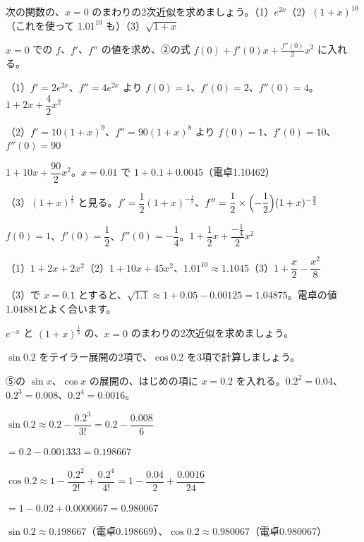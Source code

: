 \begin{reidai}[2次近似を作る]
次の関数の、$x=0$ のまわりの2次近似を求めましょう。\quad（1）$e^{2x}$\quad（2）$(1+x)^{10}$（これを使って $1.01^{10}$ も）\quad（3）$\sqrt{1+x}$\par
\kangaekata $x=0$ での $f$、$f'$、$f''$ の値を求め、②の式 $f(0)+f'(0)x+\frac{f''(0)}{2}x^2$ に入れる。\par
\shiki（1）$f'=2e^{2x}$、$f''=4e^{2x}$ より $f(0)=1$、$f'(0)=2$、$f''(0)=4$。$1+2x+\dfrac{4}{2}x^2$\par
\hspace*{2.6\zw}（2）$f'=10(1+x)^9$、$f''=90(1+x)^8$ より $f(0)=1$、$f'(0)=10$、$f''(0)=90$\par
\hspace*{4.6\zw}$1+10x+\dfrac{90}{2}x^2$。$x=0.01$ で $1+0.1+0.0045$（電卓1.10462）\par
\hspace*{2.6\zw}（3）$(1+x)^{\frac{1}{2}}$ と見る。$f'=\dfrac{1}{2}(1+x)^{-\frac{1}{2}}$、$f''=\dfrac{1}{2}\times\Bigl(-\dfrac{1}{2}\Bigr)(1+x)^{-\frac{3}{2}}$\par
\hspace*{4.6\zw}$f(0)=1$、$f'(0)=\dfrac{1}{2}$、$f''(0)=-\dfrac{1}{4}$。$1+\dfrac{1}{2}x+\dfrac{-\frac{1}{4}}{2}x^2$\par
\kotae （1）$1+2x+2x^2$\quad（2）$1+10x+45x^2$、$1.01^{10}\approx1.1045$\quad（3）$1+\dfrac{x}{2}-\dfrac{x^2}{8}$
\end{reidai}
（3）で $x=0.1$ とすると、$\sqrt{1.1}\approx1+0.05-0.00125=1.04875$。電卓の値1.04881とよく合います。

\begin{jibun}
$e^{-x}$ と $(1+x)^{\frac{1}{3}}$ の、$x=0$ のまわりの2次近似を求めましょう。
\end{jibun}

\begin{reidai}
$\sin0.2$ をテイラー展開の2項で、$\cos0.2$ を3項で計算しましょう。\par
\kangaekata ⑤の $\sin x$、$\cos x$ の展開の、はじめの項に $x=0.2$ を入れる。$0.2^2=0.04$、$0.2^3=0.008$、$0.2^4=0.0016$。\par
\shiki $\sin0.2\approx0.2-\dfrac{0.2^3}{3!}=0.2-\dfrac{0.008}{6}$\par
\hspace*{4.6\zw}$=0.2-0.001333=0.198667$\par
\hspace*{2.6\zw}$\cos0.2\approx1-\dfrac{0.2^2}{2!}+\dfrac{0.2^4}{4!}=1-\dfrac{0.04}{2}+\dfrac{0.0016}{24}$\par
\hspace*{4.6\zw}$=1-0.02+0.0000667=0.980067$\par
\kotae $\sin0.2\approx0.198667$（電卓0.198669）、$\cos0.2\approx0.980067$（電卓0.980067）
\end{reidai}

